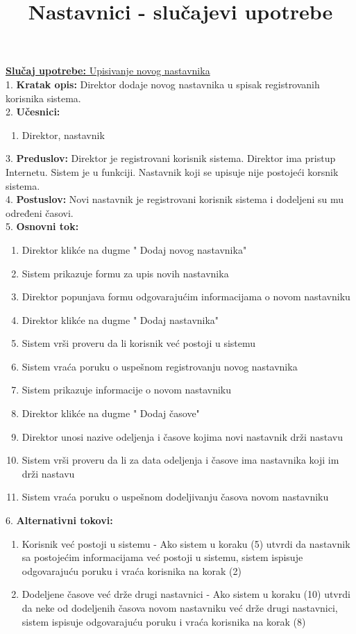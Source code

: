 \documentclass{article}
\title{Nastavnici - slučajevi upotrebe}
\begin{document}
\maketitle

\underline{\textbf{Slučaj upotrebe:} Upisivanje novog nastavnika} \\

1. \textbf{Kratak opis:} Direktor dodaje novog nastavnika u spisak registrovanih korisnika sistema.\\

2. \textbf{Učesnici:}
\begin{enumerate} 
\item Direktor, nastavnik
\end{enumerate} 

3. \textbf{Preduslov:} Direktor je registrovani korisnik sistema. Direktor ima pristup Internetu. Sistem je u funkciji. Nastavnik koji se upisuje nije postojeći korsnik sistema.\\

4. \textbf{Postuslov:}  Novi nastavnik je registrovani korisnik sistema i dodeljeni su mu određeni časovi. \\

5. \textbf{Osnovni tok:} 
\begin{enumerate} 
\item Direktor klikće na dugme " {Dodaj} novog nastavnika"
\item Sistem prikazuje formu za upis novih nastavnika
\item Direktor popunjava formu odgovarajućim informacijama o novom nastavniku
\item Direktor klikće na dugme " {Dodaj}  nastavnika"
\item Sistem vrši proveru da li korisnik već postoji u sistemu
\item Sistem vraća poruku o uspešnom registrovanju novog nastavnika
\item Sistem prikazuje informacije o novom nastavniku
\item Direktor klikće na dugme " {Dodaj}  časove"
\item Direktor unosi nazive odeljenja i časove kojima novi nastavnik drži nastavu
\item Sistem vrši proveru da li za data odeljenja i časove ima nastavnika koji im drži nastavu
\item Sistem vraća poruku o uspešnom dodeljivanju časova novom nastavniku
\end{enumerate}

6. \textbf{Alternativni tokovi:}
\begin{enumerate} 
\item Korisnik već postoji u sistemu - Ako sistem u koraku (5) utvrdi da nastavnik sa postojećim informacijama već postoji u sistemu, sistem ispisuje odgovarajuću poruku i vraća korisnika na korak (2) 
\item Dodeljene časove već drže drugi nastavnici - Ako sistem u koraku (10) utvrdi da neke od dodeljenih časova novom nastavniku već drže drugi nastavnici, sistem ispisuje odgovarajuću poruku i vraća korisnika na korak (8)
\end{enumerate}
\end{document}
